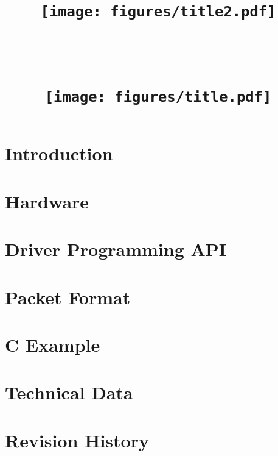 \documentclass[11pt,notitlepage]{scrreprt}
\title{
	\ \\
	\begin{center}
		\texttt{[image: figures/title2.pdf]}
	\end{center}
	\ \\
	\ \\
	\texttt{[image: figures/title.pdf]}}
\subtitle{
		\ \\
		\ \\
		\begin{center}
			\texttt{[image: figures/Ndigo5G-3Dlowres.jpg]}
		\end{center}
}
\date{}}
\begin{document}
	\newpage
	\maketitle
	\thispagestyle{empty}
	\newpage
	\tableofcontents
	\clearpage
	\pagestyle{fancy}
	\chapter{Introduction}
		
	\chapter{Hardware}
		
	\chapter{Driver Programming API}
		
	\chapter{Packet Format\label{cp:packetformat}}
		
	\chapter{C Example}
		
	\chapter{Technical Data}
		
		
	\chapter{Revision History}
		
		
		
\end{document}
